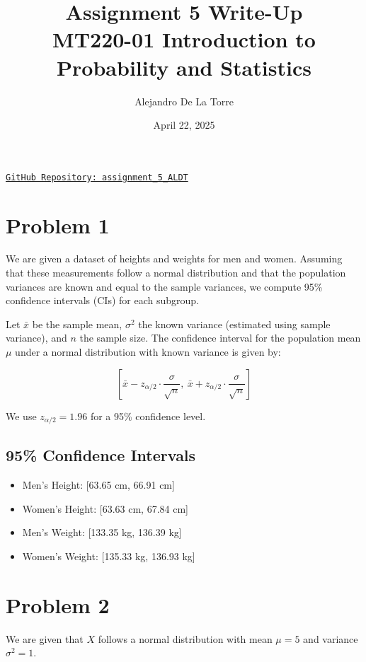 \documentclass[12pt]{article}
\title{Assignment 5 Write-Up \\ MT220-01 Introduction to Probability and Statistics}
\author{Alejandro De La Torre}
\date{April 22, 2025}
\begin{document}
\maketitle
\begin{center}
\href{https://github.com/adelatorre2/assignment_5_ALDT/tree/main}{\texttt{GitHub Repository: assignment\_5\_ALDT}}
\end{center}

\section*{Problem 1}

We are given a dataset of heights and weights for men and women. Assuming that these measurements follow a normal distribution and that the population variances are known and equal to the sample variances, we compute 95\% confidence intervals (CIs) for each subgroup.

Let $\bar{x}$ be the sample mean, $\sigma^2$ the known variance (estimated using sample variance), and $n$ the sample size. The confidence interval for the population mean $\mu$ under a normal distribution with known variance is given by:

\[
\left[ \bar{x} - z_{\alpha/2} \cdot \frac{\sigma}{\sqrt{n}},\ \bar{x} + z_{\alpha/2} \cdot \frac{\sigma}{\sqrt{n}} \right]
\]

We use $z_{\alpha/2} = 1.96$ for a 95\% confidence level.

\vspace{1em}
\subsection*{95\% Confidence Intervals}
\begin{itemize}
  \item Men's Height: [63.65 cm, 66.91 cm]
  \item Women's Height: [63.63 cm, 67.84 cm]
  \item Men's Weight: [133.35 kg, 136.39 kg]
  \item Women's Weight: [135.33 kg, 136.93 kg]

\end{itemize}


\section*{Problem 2}

We are given that $X$ follows a normal distribution with mean $\mu = 5$ and variance $\sigma^2 = 1$.
\end{document}
